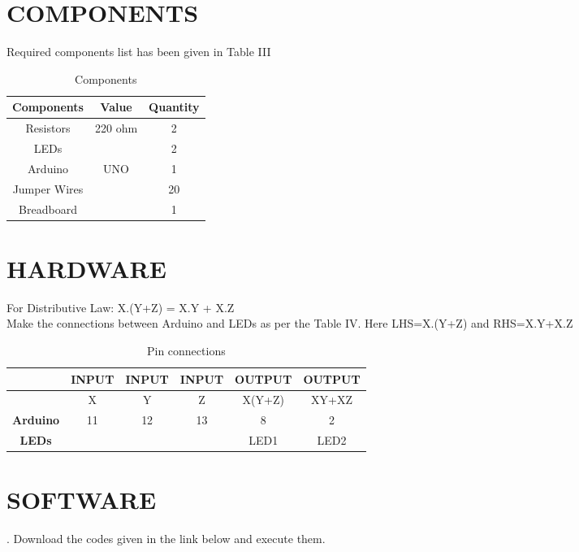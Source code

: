 \documentclass[conference]{IEEEtran}
\begin{document}
\section{COMPONENTS}
Required components list has been given in Table III
\begin{table}[h]
\centering
\begin{tabular}{| c | c | c |} \hline
\textbf{Components} & \textbf{Value} & \textbf{Quantity} \\\hline
Resistors & 220 ohm & 2 \\
LEDs &  & 2 \\
Arduino & UNO & 1 \\
Jumper Wires &  & 20 \\
Breadboard & & 1 \\ 
\hline
\end{tabular}
\vspace{0.4cm}
\caption{\label{tab:widgets}Components}
\end{table}

\section{HARDWARE}
\begin{flushleft}
For Distributive Law: X.(Y+Z) = X.Y + X.Z \\
Make the connections between Arduino and LEDs as per the Table IV. Here LHS=X.(Y+Z) and RHS=X.Y+X.Z\\

\begin{table}[h]
\begin{tabular}{|c | c | c | c | c | c |} \hline
 & \textbf{INPUT} & \textbf{INPUT} & \textbf{INPUT} & \textbf{OUTPUT} & \textbf{OUTPUT} \\\hline
 & X & Y & Z & X(Y+Z) & XY+XZ \\ \hline
\textbf{Arduino}& 11 & 12 & 13 & 8 & 2 \\ \hline
\textbf{LEDs} &  &  &  & LED1 & LED2 \\ \hline
\end{tabular}
\vspace{0.4cm}
\caption{\label{tab:widgets}Pin connections}
\end{table}
\end{flushleft}
\vspace{4cm}

\section{SOFTWARE}
. Download the codes given in the link below and execute them.\\
\end{document}
